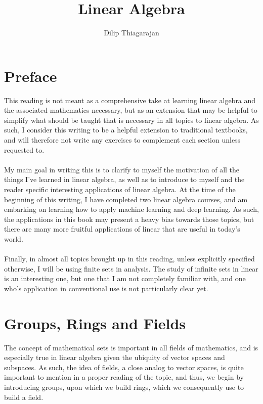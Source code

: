 \documentclass[11pt]{report}
\begin{document}
\title{Linear Algebra}
\author{Dilip Thiagarajan}
\maketitle
\tableofcontents{}
\chapter*{Preface}
This reading is not meant as a comprehensive take at learning linear algebra and the associated mathematics necessary, but as an extension that may be helpful to simplify what should be taught that is necessary in all topics to linear algebra. As such, I consider this writing to be a helpful extension to traditional textbooks, and will therefore not write any exercises to complement each section unless requested to.
\\ \\
My main goal in writing this is to clarify to myself the motivation of all the things I've learned in linear algebra, as well as to introduce to myself and the reader specific interesting applications of linear algebra. At the time of the beginning of this writing, I have completed two linear algebra courses, and am embarking on learning how to apply machine learning and deep learning. As such, the applications in this book may present a heavy bias towards those topics, but there are many more fruitful applications of linear that are useful in today's world.
\\ \\
Finally, in almost all topics brought up in this reading, unless explicitly specified otherwise, I will be using finite sets in analysis. The study of infinite sets in linear is an interesting one, but one that I am not completely familiar with, and one who's application in conventional use is not particularly clear yet.

\chapter{Groups, Rings and Fields}
The concept of mathematical sets is important in all fields of mathematics, and is especially true in linear algebra given the ubiquity of vector spaces and subspaces. As such, the idea of fields, a close analog to vector spaces, is quite important to mention in a proper reading of the topic, and thus, we begin by introducing groups, upon which we build rings, which we consequently use to build a field. 
\end{document}
